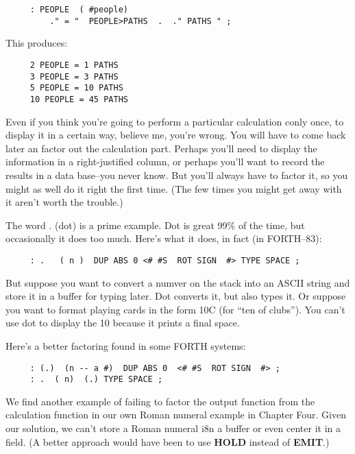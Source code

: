 \documentclass{book}
\begin{document}
\begin{verbatim}
     : PEOPLE  ( #people)
         ." = "  PEOPLE>PATHS  .  ." PATHS " ;
\end{verbatim}

\noindent
This produces:

\begin{verbatim}
     2 PEOPLE = 1 PATHS
     3 PEOPLE = 3 PATHS
     5 PEOPLE = 10 PATHS
     10 PEOPLE = 45 PATHS
\end{verbatim}

\noindent
Even if you think you're going to perform a particular calculation conly once, to display it in a certain way, believe me, you're wrong. You will have to come back later an factor out the calculation part. Perhaps you'll need to display the information in a right-justified column, or perhaps you'll want to record the results in a data base--you never know. But you'll always have to factor it, so you might as well do it right the first time. (The few times you might get away with it aren't worth the trouble.)

The word . (dot) is a prime example. Dot is great 99\% of the time, but occasionally it does too much. Here's what it does, in fact (in FORTH--83):

\begin{verbatim}
     : .   ( n )  DUP ABS 0 <# #S  ROT SIGN  #> TYPE SPACE ;
\end{verbatim}

\noindent
But suppose you want to convert a numver on the stack into an ASCII string and store it in a buffer for typing later. Dot converts it, but also types it. Or suppose you want to format playing cards in the form 10C (for ``ten of clubs''). You can't use dot to display the 10 because it prints a final space.

Here's a better factoring found in some FORTH systems:

\begin{verbatim}
     : (.)  (n -- a #)  DUP ABS 0  <# #S  ROT SIGN  #> ;
     : .  ( n)  (.) TYPE SPACE ;
\end{verbatim}

\noindent
We find another example of failing to factor the output function from the calculation function in our own Roman numeral example in Chapter Four. Given our solution, we can't store a Roman numeral i8n a buffer or even center it in a field. (A better approach would have been to use \textbf{HOLD} instead of \textbf{EMIT}.)
\end{document}
